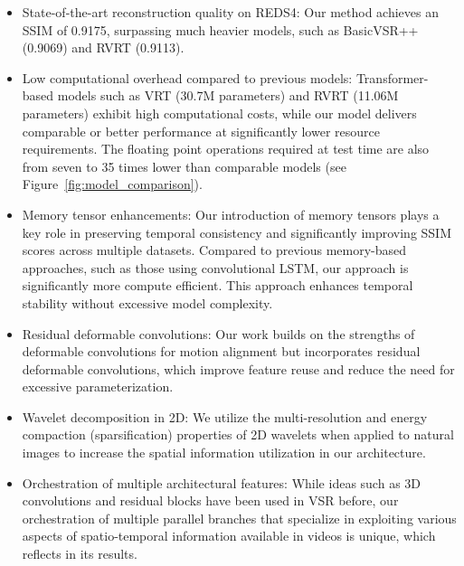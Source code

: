 \documentclass[11pt]{article}
\begin{document}
\begin{itemize}
\item State-of-the-art reconstruction quality on REDS4\cite{Nah_2019_CVPR_Workshops_SR}: Our method achieves an SSIM of 0.9175, surpassing much heavier models, such as BasicVSR++\cite{chan2022basicvsr++} (0.9069) and RVRT (0.9113)\cite{liang2022rvrt}.

\item Low computational overhead compared to previous models: Transformer-based models such as VRT (30.7M parameters)\cite{liang2022vrt} and RVRT (11.06M parameters)\cite{liang2022rvrt} exhibit high computational costs, while our model delivers comparable or better performance at significantly lower resource requirements. The floating point operations required at test time are also from seven to 35 times lower than comparable models (see Figure~\ref{fig:model_comparison}).
    
\item Memory tensor enhancements: Our introduction of memory tensors plays a key role in preserving temporal consistency and significantly improving SSIM scores across multiple datasets. Compared to previous memory-based approaches, such as those using convolutional LSTM, our approach is significantly more compute efficient. %
This approach enhances temporal stability without excessive model complexity.

\item Residual deformable convolutions: Our work builds on the strengths of deformable convolutions for motion alignment but incorporates residual deformable convolutions, which improve feature reuse and reduce the need for excessive parameterization.

\item Wavelet decomposition in 2D: We utilize the multi-resolution and energy compaction (sparsification) properties of 2D wavelets when applied to natural images to increase the spatial information utilization in our architecture.

\item Orchestration of multiple architectural features: While ideas such as 3D convolutions and residual blocks have been used in VSR before, our orchestration of multiple parallel branches that specialize in exploiting various aspects of spatio-temporal information available in videos is unique, which reflects in its results.

\end{itemize}
\end{document}
